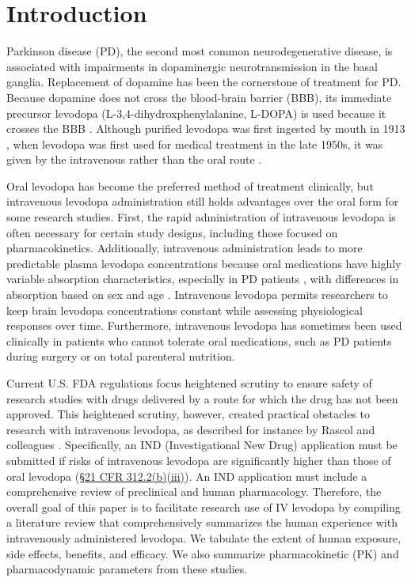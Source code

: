 \section{Introduction}
Parkinson disease (PD), the second most common neurodegenerative disease, is associated with impairments in dopaminergic neurotransmission in the basal ganglia. Replacement of dopamine has been the cornerstone of treatment for PD. Because dopamine does not cross the blood-brain barrier (BBB), its immediate precursor levodopa (L-3,4-dihydroxphenylalanine, L-DOPA) is used because it crosses the BBB \cite{11763859,13954967,5334614}. Although purified levodopa was first ingested by mouth in 1913 \cite{Roe_1997}, when levodopa was first used for medical treatment in the late 1950s, it was given by the intravenous rather than the oral route \cite{14430381,11763859}.
	
Oral levodopa has become the preferred method of treatment clinically, but intravenous levodopa administration still holds advantages over the oral form for some research studies.  First, the rapid administration of intravenous levodopa is often necessary for certain study designs, including those focused on pharmacokinetics.  Additionally, intravenous administration leads to more predictable plasma levodopa concentrations because oral medications have highly variable absorption characteristics, especially in PD patients \cite{2797454}, with differences in absorption based on sex and age \cite{2775615,12011296}.  Intravenous levodopa permits researchers to keep brain levodopa concentrations constant while assessing physiological responses over time.  Furthermore, intravenous levodopa has sometimes been used clinically in patients who cannot tolerate oral medications, such as PD patients during surgery or on total parenteral nutrition.  

Current U.S. FDA regulations focus heightened scrutiny to ensure safety of research studies with drugs delivered by a route for which the drug has not been approved. This heightened scrutiny, however, created practical obstacles to research with intravenous levodopa, as described for instance by Rascol and colleagues \cite[p. 250]{11176963}.  Specifically, an IND (Investigational New Drug) application must be submitted if risks of intravenous levodopa are significantly higher than those of oral levodopa (\href{http://www.accessdata.fda.gov/scripts/cdrh/cfdocs/cfcfr/CFRSearch.cfm?fr=312.2}{\S 21 CFR 312.2(b)(iii)}). An IND application must include a comprehensive review of preclinical and human pharmacology. Therefore, the overall goal of this paper is to facilitate research use of IV levodopa by compiling a literature review that comprehensively summarizes the human experience with intravenously administered levodopa.  We tabulate the extent of human exposure, side effects, benefits, and efficacy.  We also summarize pharmacokinetic (PK) and pharmacodynamic parameters from these studies. 
